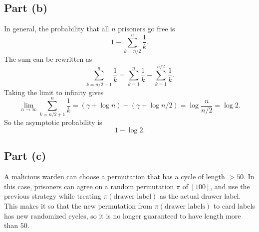 \documentclass{article}
\begin{document}
\subsection*{Part (b)}
In general, the probability that all $n$ prisoners go free is
\[
    1 - \sum_{k = n/2}^n \frac{1}{k}.
\]
The sum can be rewritten as
\[
    \sum_{k = n/2 + 1}^n \frac{1}{k} = \sum_{k = 1}^n \frac{1}{k} - \sum_{k = 1}^{n/2} \frac{1}{k}.
\]
Taking the limit to infinity gives
\[
    \lim_{n \to \infty} \sum_{k = n/2 + 1}^n \frac{1}{k} = (\gamma + \log n) - (\gamma + \log n/2) = \log \frac{n}{n/2} = \log 2.
\]
So the asymptotic probability is
\[
    1 - \log 2.
\]

\subsection*{Part (c)}
A malicious warden can choose a permutation that has a cycle of length $> 50$. In this case, prisoners can agree on a random permutation $\pi$ of $[100]$, and use the previous strategy while treating $\pi(\text{drawer label})$ as the actual drawer label. This makes it so that the new permutation from $\pi(\text{drawer labels})$ to card labels has new randomized cycles, so it is no longer guaranteed to have length more than $50$.
\end{document}
